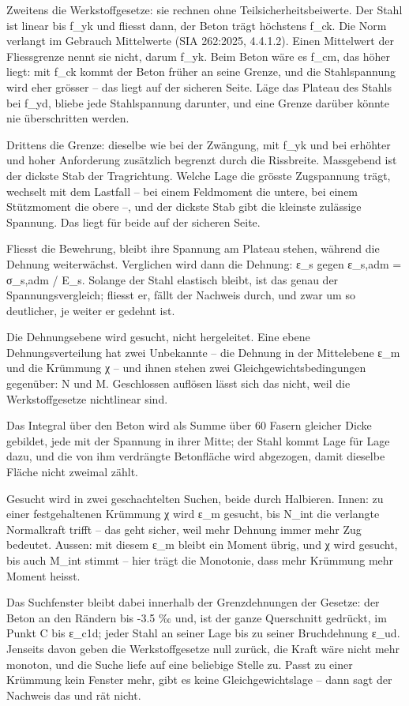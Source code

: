 \documentclass[11pt,a4paper]{article}
\begin{document}
Zweitens die Werkstoffgesetze: sie rechnen ohne Teilsicherheitsbeiwerte. Der Stahl ist linear bis f\_yk und fliesst dann, der Beton trägt höchstens f\_ck. Die Norm verlangt im Gebrauch Mittelwerte (SIA 262:2025, 4.4.1.2). Einen Mittelwert der Fliessgrenze nennt sie nicht, darum f\_yk. Beim Beton wäre es f\_cm, das höher liegt: mit f\_ck kommt der Beton früher an seine Grenze, und die Stahlspannung wird eher grösser – das liegt auf der sicheren Seite. Läge das Plateau des Stahls bei f\_yd, bliebe jede Stahlspannung darunter, und eine Grenze darüber könnte nie überschritten werden.

Drittens die Grenze: dieselbe wie bei der Zwängung, mit f\_yk und bei erhöhter und hoher Anforderung zusätzlich begrenzt durch die Rissbreite. Massgebend ist der dickste Stab der Tragrichtung. Welche Lage die grösste Zugspannung trägt, wechselt mit dem Lastfall – bei einem Feldmoment die untere, bei einem Stützmoment die obere –, und der dickste Stab gibt die kleinste zulässige Spannung. Das liegt für beide auf der sicheren Seite.

Fliesst die Bewehrung, bleibt ihre Spannung am Plateau stehen, während die Dehnung weiterwächst. Verglichen wird dann die Dehnung: ε\_s gegen ε\_s,adm = σ\_s,adm / E\_s. Solange der Stahl elastisch bleibt, ist das genau der Spannungsvergleich; fliesst er, fällt der Nachweis durch, und zwar um so deutlicher, je weiter er gedehnt ist.

Die Dehnungsebene wird gesucht, nicht hergeleitet. Eine ebene Dehnungsverteilung hat zwei Unbekannte – die Dehnung in der Mittelebene ε\_m und die Krümmung χ – und ihnen stehen zwei Gleichgewichtsbedingungen gegenüber: N und M. Geschlossen auflösen lässt sich das nicht, weil die Werkstoffgesetze nichtlinear sind.

Das Integral über den Beton wird als Summe über 60 Fasern gleicher Dicke gebildet, jede mit der Spannung in ihrer Mitte; der Stahl kommt Lage für Lage dazu, und die von ihm verdrängte Betonfläche wird abgezogen, damit dieselbe Fläche nicht zweimal zählt.

Gesucht wird in zwei geschachtelten Suchen, beide durch Halbieren. Innen: zu einer festgehaltenen Krümmung χ wird ε\_m gesucht, bis N\_int die verlangte Normalkraft trifft – das geht sicher, weil mehr Dehnung immer mehr Zug bedeutet. Aussen: mit diesem ε\_m bleibt ein Moment übrig, und χ wird gesucht, bis auch M\_int stimmt – hier trägt die Monotonie, dass mehr Krümmung mehr Moment heisst.

Das Suchfenster bleibt dabei innerhalb der Grenzdehnungen der Gesetze: der Beton an den Rändern bis -3.5 ‰ und, ist der ganze Querschnitt gedrückt, im Punkt C bis ε\_c1d; jeder Stahl an seiner Lage bis zu seiner Bruchdehnung ε\_ud. Jenseits davon geben die Werkstoffgesetze null zurück, die Kraft wäre nicht mehr monoton, und die Suche liefe auf eine beliebige Stelle zu. Passt zu einer Krümmung kein Fenster mehr, gibt es keine Gleichgewichtslage – dann sagt der Nachweis das und rät nicht.
\end{document}
